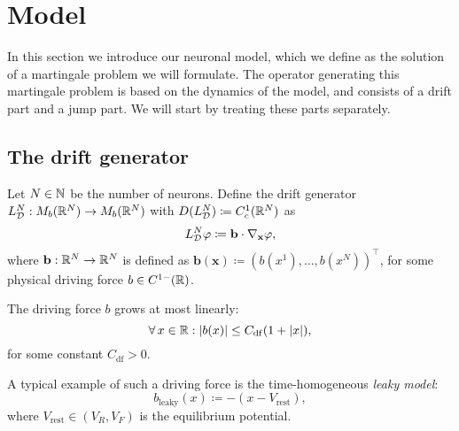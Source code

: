 \section{Model}

In this section we introduce our neuronal model, which we define as the solution of a martingale problem we will formulate.
The operator generating this martingale problem is based on the dynamics of the model, and consists of a drift part and a jump part.
We will start by treating these parts separately.

\subsection{The drift generator}

Let \( N \in \mathbb{N} \) be the number of neurons.
Define the drift generator \(L_{\mathcal{D}}^{N} : M_b(\mathbb{R}^N) \to M_b(\mathbb{R}^N)\) with \(D(L_{\mathcal{D}}^N) \coloneqq C_c^1(\mathbb{R}^N)\) as
\begin{equation}
  L_{\mathcal{D}}^{N}\varphi \coloneqq \mathbf{b} \cdot \nabla_{\mathbf{x}} \varphi,
\end{equation}
where \(\mathbf{b} : \mathbb{R}^N \to \mathbb{R}^N\) is defined as \( \bm{b}(\bm{x}) \coloneqq (b(x^1), \dots, b(x^N))^\top \), for some physical driving force \(b \in C^{1-}(\mathbb{R})\).
\begin{assumption}\label{assum:b-linear-growth}
The driving force \( b \) grows at most linearly:
  \begin{equation}
    \forall x \in \potspace : \abs{b(x)} \leq C_\mathrm{df} (1 + \abs{x}),
  \end{equation}
  for some constant \(C_\mathrm{df} > 0\).
\end{assumption}
A typical example of such a driving force is the time-homogeneous \textit{leaky model}:
\begin{equation}
  b_{\mathrm{leaky}}(x) \coloneqq -(x - V_\mathrm{rest}),
\end{equation}
where \(V_\mathrm{rest} \in (V_R, V_F)\) is the equilibrium potential.

